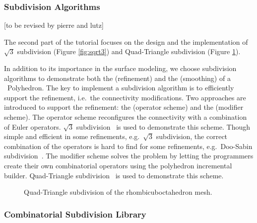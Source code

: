 \documentclass[twocolumn]{article}
\begin{document}
\subsubsection*{Subdivision Algorithms}
[to be revised by pierre and lutz]

The second part of the tutorial focuses on the design and the
implementation of $\sqrt{3}$ subdivision (Figure \ref{fig:sqrt3}) 
and Quad-Triangle subdivision (Figure \ref{fig:quad-triangle}).  

In addition to its importance in the surface modeling, we 
choose subdivision algorithms to demonstrate both the 
 (refinement) and the
 (smoothing) of a
\cgal\  Polyhedron. 
The key to implement a subdivision algorithm is to efficiently support
the refinement, i.e.\ the connectivity modifications. Two approaches
are introduced to support the refinement: the  (operator scheme) and
the  (modifier scheme). 
The operator scheme reconfigures the connectivity with a 
combination of Euler operators. $\sqrt{3}$ subdivision~\cite{sqrt3} is
used to demonstrate this scheme. Though simple and efficient in some
refinements, e.g.\ $\sqrt{3}$ subdivision, the correct combination of
the operators is hard to find for some refinements, e.g.\ Doo-Sabin
subdivision~\cite{ds}. The modifier scheme solves the problem by
letting the programmers create their own combinatorial operators 
using the polyhedron incremental builder. Quad-Triangle
subdivision~\cite{qts,l-pg-03} is used to demonstrate this scheme.


\begin{figure}[t]
    \caption{Quad-Triangle subdivision of the rhombicuboctahedron mesh.}
    \label{fig:quad-triangle}
\end{figure}


\subsubsection*{Combinatorial Subdivision Library}
\end{document}
